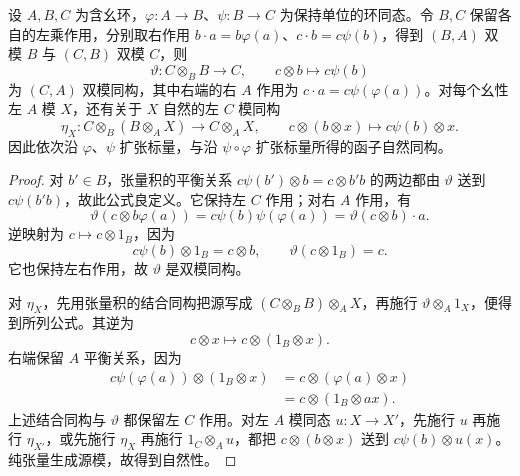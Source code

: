 \begin{proposition}\label{b4:prop:F-ring-map-composition}
	设 \(A,B,C\) 为含幺环，\(\varphi:A\rightarrow B\)、\(\psi:B\rightarrow C\) 为保持单位的环同态。令 \(B,C\) 保留各自的左乘作用，分别取右作用 \(b\cdot a=b\varphi(a)\)、\(c\cdot b=c\psi(b)\)，得到 \((B,A)\) 双模 \(B\) 与 \((C,B)\) 双模 \(C\)，则
	\[
		\vartheta:C\otimes_B B\longrightarrow C, \qquad c\otimes b\longmapsto c\psi(b)
	\]
	为 \((C,A)\) 双模同构，其中右端的右 \(A\) 作用为 \(c\cdot a=c\psi(\varphi(a))\)。对每个幺性左 \(A\) 模 \(X\)，还有关于 \(X\) 自然的左 \(C\) 模同构
	\[
		\eta_X:C\otimes_B(B\otimes_A X)\longrightarrow C\otimes_A X, \qquad c\otimes(b\otimes x)\longmapsto c\psi(b)\otimes x.
	\]
	因此依次沿 \(\varphi\)、\(\psi\) 扩张标量，与沿 \(\psi\circ\varphi\) 扩张标量所得的函子自然同构。
\end{proposition}
\begin{proof}
	对 \(b'\in B\)，张量积的平衡关系 \(c\psi(b')\otimes b=c\otimes b'b\) 的两边都由 \(\vartheta\) 送到 \(c\psi(b'b)\)，故此公式良定义。它保持左 \(C\) 作用；对右 \(A\) 作用，有
	\[
		\vartheta(c\otimes b\varphi(a)) =c\psi(b)\psi(\varphi(a)) =\vartheta(c\otimes b)\cdot a.
	\]
	逆映射为 \(c\mapsto c\otimes1_B\)，因为
	\[
		c\psi(b)\otimes1_B=c\otimes b, \qquad \vartheta(c\otimes1_B)=c.
	\]
	它也保持左右作用，故 \(\vartheta\) 是双模同构。

	对 \(\eta_X\)，先用张量积的结合同构把源写成 \((C\otimes_B B)\otimes_A X\)，再施行 \(\vartheta\otimes_A1_X\)，便得到所列公式。其逆为
	\[
		c\otimes x\longmapsto c\otimes(1_B\otimes x).
	\]
	右端保留 \(A\) 平衡关系，因为
	\[
		\begin{aligned}
			c\psi(\varphi(a))\otimes(1_B\otimes x) &=c\otimes(\varphi(a)\otimes x)\\
			&=c\otimes(1_B\otimes ax).
		\end{aligned}
	\]
	上述结合同构与 \(\vartheta\) 都保留左 \(C\) 作用。对左 \(A\) 模同态 \(u:X\rightarrow X'\)，先施行 \(u\) 再施行 \(\eta_{X'}\)，或先施行 \(\eta_X\) 再施行 \(1_C\otimes_Au\)，都把 \(c\otimes(b\otimes x)\) 送到 \(c\psi(b)\otimes u(x)\)。纯张量生成源模，故得到自然性。
\end{proof}


